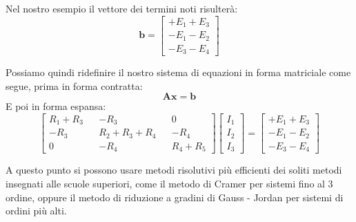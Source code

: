 Nel nostro esempio il vettore dei termini noti risulterà:
\begin{equation}
    \mathbf{b} =
    \begin{bmatrix}
        + E_1 + E_3 \\
        - E_1 - E_2 \\
        - E_3 - E_4
    \end{bmatrix}
\end{equation}

Possiamo quindi ridefinire il nostro sistema di equazioni in forma matriciale come segue, prima in forma contratta:
\begin{equation}
    \mathbf{A} \mathbf{x} = \mathbf{b}
\end{equation}
E poi in forma espansa:
\begin{equation}
    \begin{bmatrix}
        R_1+R_3 &  & -R_3        &  & 0       \\
        -R_3    &  & R_2+R_3+R_4 &  & -R_4    \\
        0       &  & -R_4        &  & R_4+R_5
    \end{bmatrix}
    \begin{bmatrix}
        I_1 \\
        I_2 \\
        I_3
    \end{bmatrix}
    =
    \begin{bmatrix}
        + E_1 + E_3 \\
        - E_1 - E_2 \\
        - E_3 - E_4
    \end{bmatrix}
\end{equation}

A questo punto si possono usare metodi risolutivi più efficienti dei soliti metodi insegnati alle scuole superiori, come il metodo di Cramer per sistemi fino al 3 ordine, oppure il metodo di riduzione a gradini di Gauss - Jordan per sistemi di ordini più alti.



